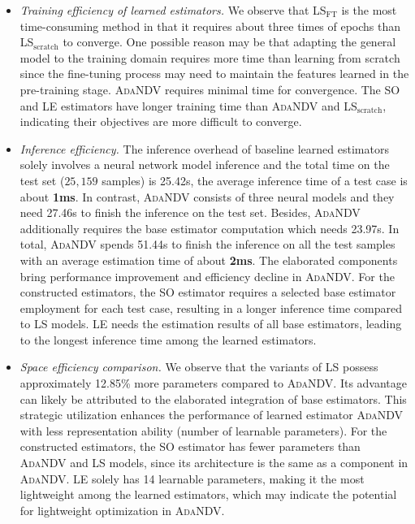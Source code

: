 \begin{itemize}[leftmargin=10pt]
\item \textit{Training efficiency of learned estimators.} 
We observe that LS$_{\mathrm{FT}}$ is the most time-consuming method in that it requires about three times of epochs than LS$_{\mathrm{scratch}}$ to converge. 
One possible reason may be that adapting the general model to the training domain requires more time than learning from scratch since the fine-tuning process may need to maintain the features learned in the pre-training stage.  
{\textsc{AdaNDV} requires minimal time for convergence.}
The SO and LE estimators have longer training time than \textsc{AdaNDV} and LS$_{\mathrm{scratch}}$, indicating their objectives are more difficult to converge.


\item \textit{Inference efficiency.} 
The inference overhead of baseline learned estimators solely involves a neural network model inference and the total time on the test set ($25,159$ samples) is 25.42s, the average inference time of a test case is about \textbf{1ms}. 
In {contrast}, \textsc{AdaNDV} consists of three neural models and they need 27.46s to finish the inference on the test set. 
Besides, \textsc{AdaNDV} additionally requires the base estimator computation which needs 23.97s. 
In total, \textsc{AdaNDV} spends 51.44s to finish the inference on all the test samples with an average estimation time of about \textbf{2ms}.
The elaborated components bring performance improvement and efficiency decline in \textsc{AdaNDV}.
For the constructed estimators, the SO estimator requires a selected base estimator employment for each test case, resulting in a longer inference time compared to LS models. LE needs the estimation results of all base estimators, leading to the longest inference time among the learned estimators.


\item \textit{Space efficiency comparison.} 
We observe that the variants of LS possess approximately 12.85\% more parameters compared to \textsc{AdaNDV}.
Its advantage can likely be attributed to the elaborated integration of base estimators. 
This strategic utilization enhances the performance of learned estimator \textsc{AdaNDV} with less representation ability (number of learnable parameters). 
For the constructed estimators, the SO estimator has fewer parameters than \textsc{AdaNDV} and LS models, since its architecture is the same as a component in \textsc{AdaNDV}. LE solely has 14 learnable parameters, making it the most lightweight among the learned estimators, which may indicate the potential for lightweight optimization in \textsc{AdaNDV}.

\end{itemize}




